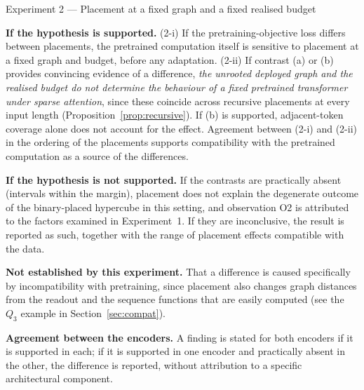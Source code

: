\documentclass[10pt]{article}
\newcommand{\cardfield}[1]{\par\smallskip\noindent\textbf{#1.}\enspace}
\newcommand{\cardpos}[1]{\par\smallskip\noindent\textcolor{green!40!black}{\textbf{If the hypothesis is supported.}}\enspace}
\newcommand{\cardneg}[1]{\par\smallskip\noindent\textcolor{orange!75!black}{\textbf{If the hypothesis is not supported.}}\enspace}
\newcommand{\cardcannot}[1]{\par\smallskip\noindent\textbf{Not established by this experiment.}\enspace}
\begin{document}
\begin{expcard}{Experiment 2 --- Placement at a fixed graph and a fixed realised budget}
\cardpos{} (2-i) If the pretraining-objective loss differs between placements, the pretrained computation itself is sensitive to placement at a fixed graph and budget, before any adaptation. (2-ii) If contrast (a) or (b) provides convincing evidence of a difference, \emph{the unrooted deployed graph and the realised budget do not determine the behaviour of a fixed pretrained transformer under sparse attention}, since these coincide across recursive placements at every input length (Proposition~\ref{prop:recursive}). If (b) is supported, adjacent-token coverage alone does not account for the effect. Agreement between (2-i) and (2-ii) in the ordering of the placements supports compatibility with the pretrained computation as a source of the differences.
\cardneg{} If the contrasts are practically absent (intervals within the margin), placement does not explain the degenerate outcome of the binary-placed hypercube in this setting, and observation O2 is attributed to the factors examined in Experiment~1. If they are inconclusive, the result is reported as such, together with the range of placement effects compatible with the data.
\cardcannot{} That a difference is caused specifically by incompatibility with pretraining, since placement also changes graph distances from the readout and the sequence functions that are easily computed (see the $Q_3$ example in Section~\ref{sec:compat}).
\cardfield{Agreement between the encoders} A finding is stated for both encoders if it is supported in each; if it is supported in one encoder and practically absent in the other, the difference is reported, without attribution to a specific architectural component.
\end{expcard}
\end{document}
